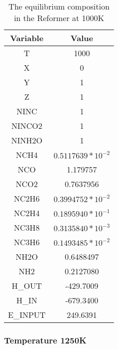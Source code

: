 \documentclass[journal=iecred,manuscript=article]{achemso}
\begin{document}
\FloatBarrier
\begin{table}[H]
\caption{The equilibrium composition in the Reformer at 1000K} 
\centering
\begin{tabular}{|c|c|}
\hline\hline %
Variable & Value \\ 
[1ex] %
\hline %
T	& 1000 \\
\hline
X	 & 0 \\
\hline
Y	& 1 \\
\hline
Z	& 1 \\
\hline
NINC	& 1 \\
\hline
NINCO2	& 1 \\
\hline
NINH2O	& 1 \\
\hline
NCH4 &	$0.5117639*10^{-2}$ \\
\hline
NCO	&  1.179757 \\
\hline
NCO2	& 0.7637956 \\
\hline
NC2H6	& $0.3994752*10^{-2}$ \\
\hline
NC2H4	& $0.1895940*10^{-1}$ \\
\hline
NC3H8	& $0.3135840*10^{-3}$ \\
\hline
NC3H6	& $0.1493485*10^{-2}$ \\
\hline
NH2O	& 0.6488497 \\
\hline
NH2 & 0.2127080 \\
\hline
H_{OUT}	& -429.7009 \\
\hline
H_{IN}	& -679.3400 \\
\hline
E_{INPUT}	& 249.6391 \\
\hline 

\end{tabular}
\end{table}
\FloatBarrier

\subsubsection{Temperature 1250K}
\end{document}
